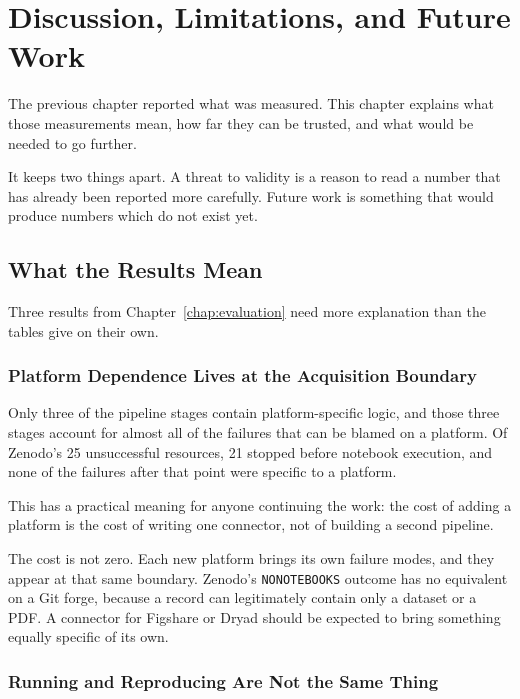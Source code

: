 \chapter{Discussion, Limitations, and Future Work}
\label{chap:future-work}

The previous chapter reported what was measured. This chapter explains what those measurements mean, how far they can be trusted, and what would be needed to go further.

It keeps two things apart. A threat to validity is a reason to read a number that has already been reported more carefully. Future work is something that would produce numbers which do not exist yet.

\section{What the Results Mean}
\label{sec:discussion}

Three results from Chapter~\ref{chap:evaluation} need more explanation than the tables give on their own.

\subsection{Platform Dependence Lives at the Acquisition Boundary}

Only three of the pipeline stages contain platform-specific logic, and those three stages account for almost all of the failures that can be blamed on a platform. Of Zenodo's 25 unsuccessful resources, 21 stopped before notebook execution, and none of the failures after that point were specific to a platform.

This has a practical meaning for anyone continuing the work: the cost of adding a platform is the cost of writing one connector, not of building a second pipeline.

The cost is not zero. Each new platform brings its own failure modes, and they appear at that same boundary. Zenodo's \texttt{NO\ub NOTEBOOKS} outcome has no equivalent on a Git forge, because a record can legitimately contain only a dataset or a PDF. A connector for Figshare or Dryad should be expected to bring something equally specific of its own.

\subsection{Running and Reproducing Are Not the Same Thing}

